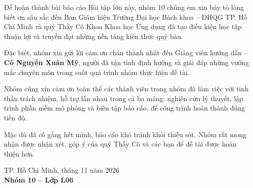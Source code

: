 
Để hoàn thành bài báo cáo Bài tập lớn này, nhóm 10 chúng em xin bày tỏ lòng
biết ơn sâu sắc đến Ban Giám hiệu Trường Đại học Bách khoa -- ĐHQG TP. Hồ Chí
Minh và quý Thầy Cô Khoa Khoa học Ứng dụng đã tạo điều kiện học tập thuận lợi
và truyền đạt những nền tảng kiến thức quý báu.

Đặc biệt, nhóm xin gửi lời cảm ơn chân thành nhất đến Giảng viên hướng dẫn --
\textbf{Cô Nguyễn Xuân Mỹ}, người đã tận tình định hướng và giải đáp những
vướng mắc chuyên môn trong suốt quá trình nhóm thực hiện đề tài.

Nhóm cũng xin cảm ơn toàn thể các thành viên trong nhóm đã làm việc với tinh
thần trách nhiệm, hỗ trợ lẫn nhau trong cả ba mảng: nghiên cứu lý thuyết, lập
trình phần mềm mô phỏng và biên tập báo cáo, để công trình hoàn thành đúng tiến
độ.

Mặc dù đã cố gắng hết mình, báo cáo khó tránh khỏi thiếu sót. Nhóm rất mong
nhận được nhận xét, góp ý của quý Thầy Cô và các bạn để đề tài được hoàn thiện
hơn.

\vspace{1cm}
\begin{flushright}
\begin{minipage}{8cm}\centering
TP. Hồ Chí Minh, tháng 11 năm 2026\\
\textbf{Nhóm 10 -- Lớp L06}
\end{minipage}
\end{flushright}
